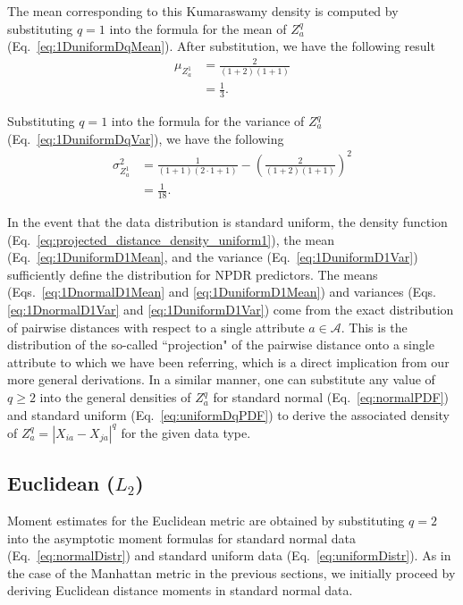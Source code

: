 \documentclass[10pt,letterpaper]{article}
\begin{document}
The mean corresponding to this Kumaraswamy density is computed by substituting $q=1$ into the formula for the mean of $Z^q_a$ (Eq.~\ref{eq:1DuniformDqMean}). After substitution, we have the following result
%
\begin{equation}\label{eq:1DuniformD1Mean}
\begin{aligned}
\mu_{Z^1_a} &= \frac{2}{(1 + 2)(1 + 1)} \\
&= \frac{1}{3}.
\end{aligned}
\end{equation}

Substituting $q=1$ into the formula for the variance of $Z^q_a$ (Eq.~\ref{eq:1DuniformDqVar}), we have the following
%
\begin{equation}\label{eq:1DuniformD1Var}
\begin{aligned}
\sigma^2_{Z^1_a} &= \frac{1}{(1 + 1)(2\cdot 1 + 1)} - \left(\frac{2}{(1 + 2)(1 + 1)}\right)^2 \\
&= \frac{1}{18}.
\end{aligned}
\end{equation}

In the event that the data distribution is standard uniform, the density function (Eq.~\ref{eq:projected_distance_density_uniform1}), the mean (Eq.~\ref{eq:1DuniformD1Mean}, and the variance (Eq.~\ref{eq:1DuniformD1Var}) sufficiently define the distribution for NPDR predictors. The means (Eqs.~\ref{eq:1DnormalD1Mean} and \ref{eq:1DuniformD1Mean}) and variances (Eqs.\ref{eq:1DnormalD1Var} and \ref{eq:1DuniformD1Var}) come from the exact distribution of pairwise distances with respect to a single attribute $a \in \mathcal{A}$. This is the distribution of the so-called ``projection" of the pairwise distance onto a single attribute to which we have been referring, which is a direct implication from our more general derivations. In a similar manner, one can substitute any value of $q \geq 2$ into the general densities of $Z^q_a$ for standard normal (Eq.~\ref{eq:normalPDF}) and standard uniform (Eq.~\ref{eq:uniformDqPDF}) to derive the associated density of $Z^q_a = |X_{ia} - X_{ja}|^q$ for the given data type.

\subsection*{Euclidean \texorpdfstring{($L_2$)}{}}

Moment estimates for the Euclidean metric are obtained by substituting $q=2$ into the asymptotic moment formulas for standard normal data (Eq.~\ref{eq:normalDistr}) and standard uniform data (Eq.~\ref{eq:uniformDistr}). As in the case of the Manhattan metric in the previous sections, we initially proceed by deriving Euclidean distance moments in standard normal data.
\end{document}
